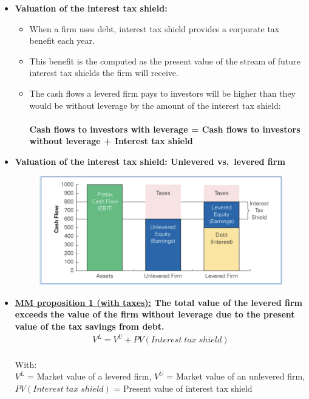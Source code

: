 \documentclass[ieeetran]{article}
\begin{document}
\begin{itemize}
  \item \textbf{Valuation of the interest tax shield:}
	  \begin{itemize}
	    \item When a firm uses debt, interest tax shield provides a corporate tax benefit each year.
	\item This benefit is the computed as the present value of the stream of future interest tax shields the firm will receive.
	\item The cash flows a levered firm pays to investors will be higher than they would be without leverage by the amount of the interest tax shield:\\ \\
		\textbf{Cash flows to investors with leverage = Cash flows to investors without leverage + Interest tax shield} 	
	  \end{itemize}

\pagebreak
\item \textbf{Valuation of the interest tax shield: Unlevered vs.\ levered firm}
	\begin{figure}[h!]
	  \centering
	  \includegraphics[width=0.8\linewidth]{interesttaxshield.jpg}
	  \label{fig:interesttaxshield_jpg}
	\end{figure}

\item \textbf{\underline{MM proposition 1 (with taxes):} The total value of the levered firm exceeds the value of the firm without leverage due to the present value of the tax savings from debt.}
	\large
	\begin{equation*}
	\boxed{
	\begin{aligned}
	V^L = V^U + PV(Interest \; tax \; shield)
	\end{aligned}
	}
	\end{equation*}
	\\
	\normalsize
	With: \\
	$V^L$ = Market value of a levered firm, $V^U$ = Market value of an unlevered firm, $PV(Interest \; tax \; shield)$ = Present value of interest tax shield


\end{itemize}
\end{document}
